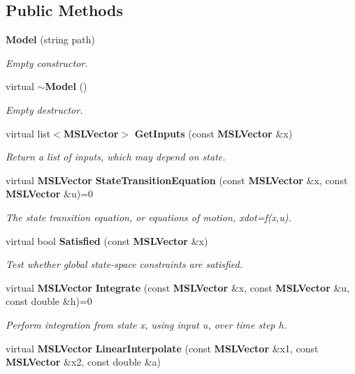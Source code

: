 \subsection*{Public Methods}
\begin{CompactItemize}
\item 
{\bf Model} (string path)
\begin{CompactList}\small\item\em Empty constructor.\item\end{CompactList}\item 
virtual {\bf $\sim$Model} ()
\begin{CompactList}\small\item\em Empty destructor.\item\end{CompactList}\item 
virtual list$<${\bf MSLVector}$>$ {\bf Get\-Inputs} (const {\bf MSLVector} \&x)
\begin{CompactList}\small\item\em Return a list of inputs, which may depend on state.\item\end{CompactList}\item 
virtual {\bf MSLVector} {\bf State\-Transition\-Equation} (const {\bf MSLVector} \&x, const {\bf MSLVector} \&u)=0
\begin{CompactList}\small\item\em The state transition equation, or equations of motion, xdot=f(x,u).\item\end{CompactList}\item 
virtual bool {\bf Satisfied} (const {\bf MSLVector} \&x)
\begin{CompactList}\small\item\em Test whether global state-space constraints are satisfied.\item\end{CompactList}\item 
virtual {\bf MSLVector} {\bf Integrate} (const {\bf MSLVector} \&x, const {\bf MSLVector} \&u, const double \&h)=0
\begin{CompactList}\small\item\em Perform integration from state x, using input u, over time step h.\item\end{CompactList}\item 
virtual {\bf MSLVector} {\bf Linear\-Interpolate} (const {\bf MSLVector} \&x1, const {\bf MSLVector} \&x2, const double \&a)

\end{CompactItemize}
